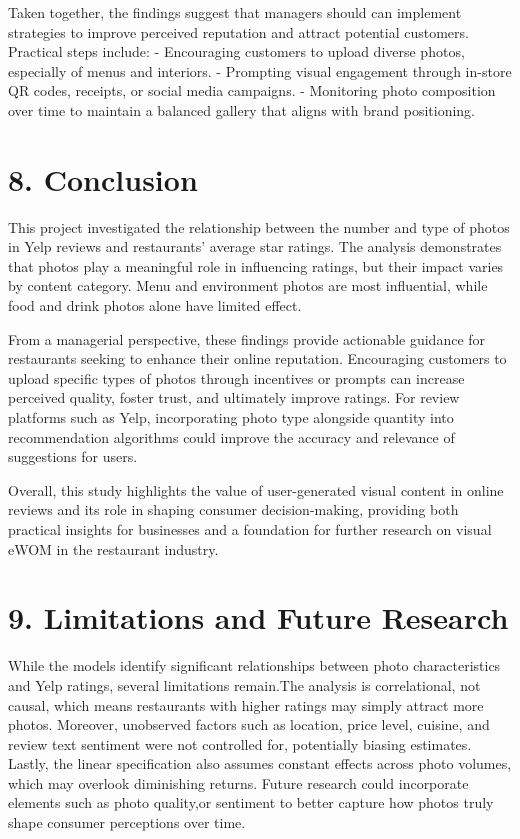 \documentclass[
]{article}
\begin{document}
Taken together, the findings suggest that managers should can implement
strategies to improve perceived reputation and attract potential
customers. Practical steps include: - Encouraging customers to upload
diverse photos, especially of menus and interiors. - Prompting visual
engagement through in-store QR codes, receipts, or social media
campaigns. - Monitoring photo composition over time to maintain a
balanced gallery that aligns with brand positioning.

\section{8. Conclusion}\label{conclusion}

This project investigated the relationship between the number and type
of photos in Yelp reviews and restaurants' average star ratings. The
analysis demonstrates that photos play a meaningful role in influencing
ratings, but their impact varies by content category. Menu and
environment photos are most influential, while food and drink photos
alone have limited effect.

From a managerial perspective, these findings provide actionable
guidance for restaurants seeking to enhance their online reputation.
Encouraging customers to upload specific types of photos through
incentives or prompts can increase perceived quality, foster trust, and
ultimately improve ratings. For review platforms such as Yelp,
incorporating photo type alongside quantity into recommendation
algorithms could improve the accuracy and relevance of suggestions for
users.

Overall, this study highlights the value of user-generated visual
content in online reviews and its role in shaping consumer
decision-making, providing both practical insights for businesses and a
foundation for further research on visual eWOM in the restaurant
industry.

\section{9. Limitations and Future
Research}\label{limitations-and-future-research}

While the models identify significant relationships between photo
characteristics and Yelp ratings, several limitations remain.The
analysis is correlational, not causal, which means restaurants with
higher ratings may simply attract more photos. Moreover, unobserved
factors such as location, price level, cuisine, and review text
sentiment were not controlled for, potentially biasing estimates.
Lastly, the linear specification also assumes constant effects across
photo volumes, which may overlook diminishing returns. Future research
could incorporate elements such as photo quality,or sentiment to better
capture how photos truly shape consumer perceptions over time.
\end{document}
